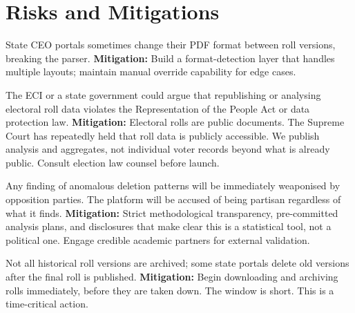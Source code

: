 \documentclass[11pt, a4paper]{article}
\begin{document}
\section{Risks and Mitigations}

\begin{tcolorbox}[colback=warnorange!8, colframe=warnorange, sharp corners, boxrule=0.6pt, title={\bfseries Risk 1: PDF Format Variability}]
State CEO portals sometimes change their PDF format between roll versions, breaking the parser. \textbf{Mitigation:} Build a format-detection layer that handles multiple layouts; maintain manual override capability for edge cases.
\end{tcolorbox}

\vspace{0.5em}

\begin{tcolorbox}[colback=warnorange!8, colframe=warnorange, sharp corners, boxrule=0.6pt, title={\bfseries Risk 2: Legal Challenge}]
The ECI or a state government could argue that republishing or analysing electoral roll data violates the Representation of the People Act or data protection law. \textbf{Mitigation:} Electoral rolls are public documents. The Supreme Court has repeatedly held that roll data is publicly accessible. We publish analysis and aggregates, not individual voter records beyond what is already public. Consult election law counsel before launch.
\end{tcolorbox}

\vspace{0.5em}

\begin{tcolorbox}[colback=warnorange!8, colframe=warnorange, sharp corners, boxrule=0.6pt, title={\bfseries Risk 3: Political Sensitivity}]
Any finding of anomalous deletion patterns will be immediately weaponised by opposition parties. The platform will be accused of being partisan regardless of what it finds. \textbf{Mitigation:} Strict methodological transparency, pre-committed analysis plans, and disclosures that make clear this is a statistical tool, not a political one. Engage credible academic partners for external validation.
\end{tcolorbox}

\vspace{0.5em}

\begin{tcolorbox}[colback=warnorange!8, colframe=warnorange, sharp corners, boxrule=0.6pt, title={\bfseries Risk 4: Data Completeness}]
Not all historical roll versions are archived; some state portals delete old versions after the final roll is published. \textbf{Mitigation:} Begin downloading and archiving rolls immediately, before they are taken down. The window is short. This is a time-critical action.
\end{tcolorbox}
\end{document}
